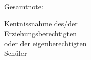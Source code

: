 \documentclass[10pt,a4paper]{article}
\begin{document}
{\begin{tcolorbox}[arc=0mm,  standard jigsaw, opacityback=0, boxrule=1pt]
Gesamtnote: \\
\end{tcolorbox}

\begin{tcolorbox}[arc=0mm,  standard jigsaw, opacityback=0, boxrule=1pt]
Kentnissnahme des/der \\
Erziehungsberechtigten \\
oder der eigenberechtigten \\
Schüler
\end{tcolorbox}

}
\newpage

\begin{enumerate}[leftmargin=*]


\end{enumerate}
\end{document}
